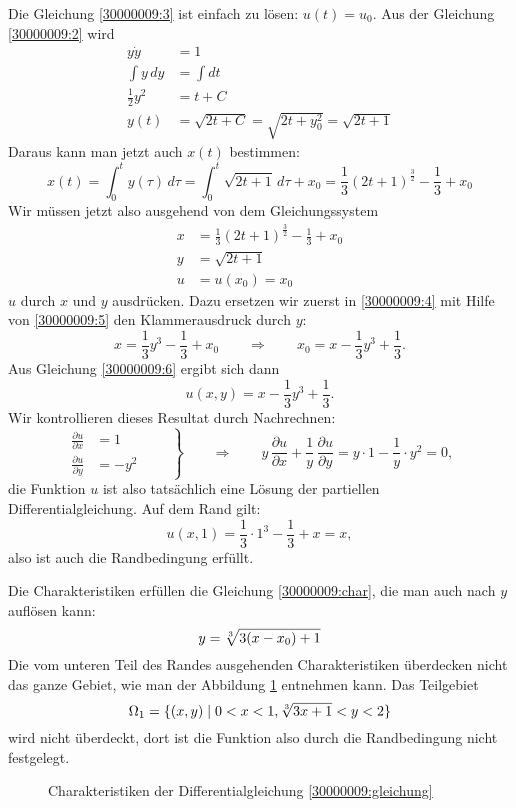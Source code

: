 \begin{loesung}
\begin{teilaufgaben}
Die Gleichung \eqref{30000009:3} ist einfach zu lösen: $u(t)=u_0$.
Aus der Gleichung \eqref{30000009:2} wird
\begin{align*}
y\dot y&=1\\
\int y\,dy&=\int dt\\
\frac12y^2&=t+C\\
y(t)&=\sqrt{2t+C}=\sqrt{2t+y_0^2}=\sqrt{2t+1}
\end{align*}
Daraus kann man jetzt auch $x(t)$ bestimmen:
\[
x(t)= \int_0^ty(\tau)\,d\tau
=\int_0^t\sqrt{2t+1}\,d\tau + x_0
=\frac13(2t+1)^{\frac{3}{2}}-\frac13+x_0
\]
Wir müssen jetzt also ausgehend von dem Gleichungssystem
\begin{align}
x&=\frac13(2t+1)^{\frac32}-\frac13+x_0\label{30000009:4}\\
y&=\sqrt{2t+1}\label{30000009:5}\\
u&=u(x_0)=x_0\label{30000009:6}
\end{align}
$u$ durch $x$ und $y$ ausdrücken. Dazu ersetzen wir zuerst in 
\eqref{30000009:4} mit Hilfe von \eqref{30000009:5} den Klammerausdruck
durch $y$:
\begin{equation}
x=\frac13y^3-\frac13+x_0\qquad\Rightarrow\qquad x_0=x-\frac13y^3+\frac13.
\label{30000009:char}
\end{equation}
Aus Gleichung \eqref{30000009:6} ergibt sich dann
\[
u(x,y)=x-\frac13y^3+\frac13.
\]
Wir kontrollieren dieses Resultat durch Nachrechnen:
\[
\left.
\begin{aligned}
\frac{\partial u}{\partial x}
&=
1
\\
\frac{\partial u}{\partial y}
&=
-y^2
\end{aligned}
\qquad
\right\}
\qquad
\Rightarrow
\qquad
y\,\frac{\partial u}{\partial x}
+\frac1y\,\frac{\partial u}{\partial y}
=
y\cdot 1-\frac1y\cdot y^2=0,
\]
die Funktion $u$ ist also tatsächlich eine Lösung der partiellen
Differentialgleichung. Auf dem Rand gilt:
\[
u(x,1)=\frac13\cdot1^3-\frac13+x=x,
\]
also ist auch die Randbedingung erfüllt.
\item
Die Charakteristiken erfüllen die Gleichung \eqref{30000009:char}, die
man auch nach $y$ auflösen kann:
\[
y=\root3\of{3(x-x_0)+1}
\]
Die vom unteren Teil des Randes ausgehenden Charakteristiken überdecken
nicht das ganze Gebiet, wie man der Abbildung \ref{30000009:charakteristiken}
entnehmen kann. Das Teilgebiet 
\[
\Omega_1=\{(x,y)\;|\; 0<x<1, \root3\of{3x+1} < y < 2\}
\]
wird nicht überdeckt, dort ist die Funktion also durch die Randbedingung
nicht festgelegt.
\qedhere
\end{teilaufgaben}
\begin{figure}
\begin{center}
\end{center}
\caption{Charakteristiken der Differentialgleichung \eqref{30000009:gleichung}
\label{30000009:charakteristiken}}
\end{figure}
\end{loesung}

